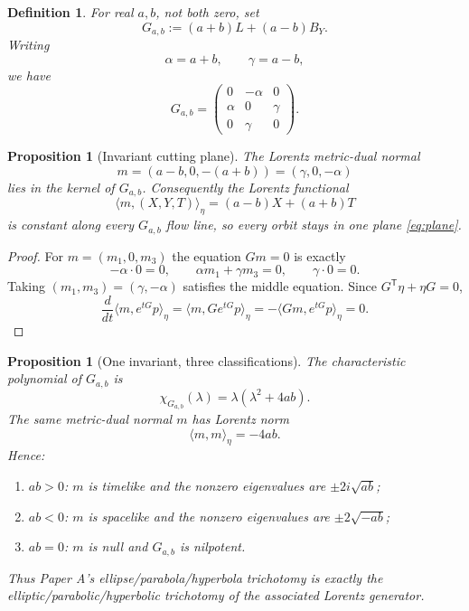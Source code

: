 \documentclass[11pt]{amsart}
\newtheorem{proposition}[theorem]{Proposition}
\newtheorem{definition}[theorem]{Definition}
\theoremstyle{remark}
\begin{document}
\begin{definition}
For real $a,b$, not both zero, set
\begin{equation}\label{eq:G}
G_{a,b}:=(a+b)L+(a-b)B_Y.
\end{equation}
Writing
\[
\alpha=a+b,
\qquad
\gamma=a-b,
\]
we have
\[
G_{a,b}
=\begin{pmatrix}
0&-\alpha&0\\
\alpha&0&\gamma\\
0&\gamma&0
\end{pmatrix}.
\]
\end{definition}

\begin{proposition}[Invariant cutting plane]\label{prop:invariant}
The Lorentz metric-dual normal
\[
m=(a-b,0,-(a+b))=(\gamma,0,-\alpha)
\]
lies in the kernel of $G_{a,b}$.  Consequently the Lorentz functional
\[
\langle m,(X,Y,T)\rangle_\eta
=(a-b)X+(a+b)T
\]
is constant along every $G_{a,b}$ flow line, so every orbit stays in one plane \eqref{eq:plane}.
\end{proposition}

\begin{proof}
For $m=(m_1,0,m_3)$ the equation $Gm=0$ is exactly
\[
-\alpha\cdot0=0,
\qquad
\alpha m_1+\gamma m_3=0,
\qquad
\gamma\cdot0=0.
\]
Taking $(m_1,m_3)=(\gamma,-\alpha)$ satisfies the middle equation.  Since $G^{\mathsf T}\eta+\eta G=0$,
\[
\frac{d}{dt}\langle m,e^{tG}p\rangle_\eta
=\langle m,Ge^{tG}p\rangle_\eta
=-\langle Gm,e^{tG}p\rangle_\eta=0.
\]
\end{proof}

\begin{proposition}[One invariant, three classifications]\label{prop:classification}
The characteristic polynomial of $G_{a,b}$ is
\begin{equation}\label{eq:charpoly}
\boxed{\chi_{G_{a,b}}(\lambda)=\lambda(\lambda^2+4ab).}
\end{equation}
The same metric-dual normal $m$ has Lorentz norm
\begin{equation}\label{eq:normalnorm}
\boxed{\langle m,m\rangle_\eta=-4ab.}
\end{equation}
Hence:
\begin{enumerate}
\renewcommand{\labelenumi}{(\roman{enumi})}
\item $ab>0$: $m$ is timelike and the nonzero eigenvalues are $\pm2i\sqrt{ab}$;
\item $ab<0$: $m$ is spacelike and the nonzero eigenvalues are $\pm2\sqrt{-ab}$;
\item $ab=0$: $m$ is null and $G_{a,b}$ is nilpotent.
\end{enumerate}
Thus Paper A's ellipse/parabola/hyperbola trichotomy is exactly the elliptic/parabolic/hyperbolic trichotomy of the associated Lorentz generator.
\end{proposition}
\end{document}
